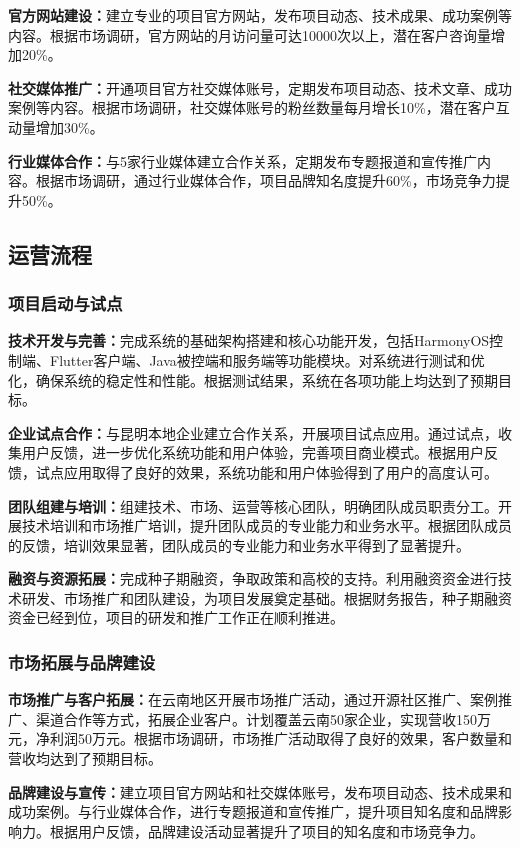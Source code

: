 \documentclass[12pt,a4paper]{article}
\begin{document}
\textbf{官方网站建设：}建立专业的项目官方网站，发布项目动态、技术成果、成功案例等内容。根据市场调研，官方网站的月访问量可达10000次以上，潜在客户咨询量增加20\%。

\textbf{社交媒体推广：}开通项目官方社交媒体账号，定期发布项目动态、技术文章、成功案例等内容。根据市场调研，社交媒体账号的粉丝数量每月增长10\%，潜在客户互动量增加30\%。

\textbf{行业媒体合作：}与5家行业媒体建立合作关系，定期发布专题报道和宣传推广内容。根据市场调研，通过行业媒体合作，项目品牌知名度提升60\%，市场竞争力提升50\%。

\subsection{运营流程}

\subsubsection{项目启动与试点}
\textbf{技术开发与完善：}完成系统的基础架构搭建和核心功能开发，包括HarmonyOS控制端、Flutter客户端、Java被控端和服务端等功能模块。对系统进行测试和优化，确保系统的稳定性和性能。根据测试结果，系统在各项功能上均达到了预期目标。

\textbf{企业试点合作：}与昆明本地企业建立合作关系，开展项目试点应用。通过试点，收集用户反馈，进一步优化系统功能和用户体验，完善项目商业模式。根据用户反馈，试点应用取得了良好的效果，系统功能和用户体验得到了用户的高度认可。

\textbf{团队组建与培训：}组建技术、市场、运营等核心团队，明确团队成员职责分工。开展技术培训和市场推广培训，提升团队成员的专业能力和业务水平。根据团队成员的反馈，培训效果显著，团队成员的专业能力和业务水平得到了显著提升。

\textbf{融资与资源拓展：}完成种子期融资，争取政策和高校的支持。利用融资资金进行技术研发、市场推广和团队建设，为项目发展奠定基础。根据财务报告，种子期融资资金已经到位，项目的研发和推广工作正在顺利推进。

\subsubsection{市场拓展与品牌建设}
\textbf{市场推广与客户拓展：}在云南地区开展市场推广活动，通过开源社区推广、案例推广、渠道合作等方式，拓展企业客户。计划覆盖云南50家企业，实现营收150万元，净利润50万元。根据市场调研，市场推广活动取得了良好的效果，客户数量和营收均达到了预期目标。

\textbf{品牌建设与宣传：}建立项目官方网站和社交媒体账号，发布项目动态、技术成果和成功案例。与行业媒体合作，进行专题报道和宣传推广，提升项目知名度和品牌影响力。根据用户反馈，品牌建设活动显著提升了项目的知名度和市场竞争力。
\end{document}
